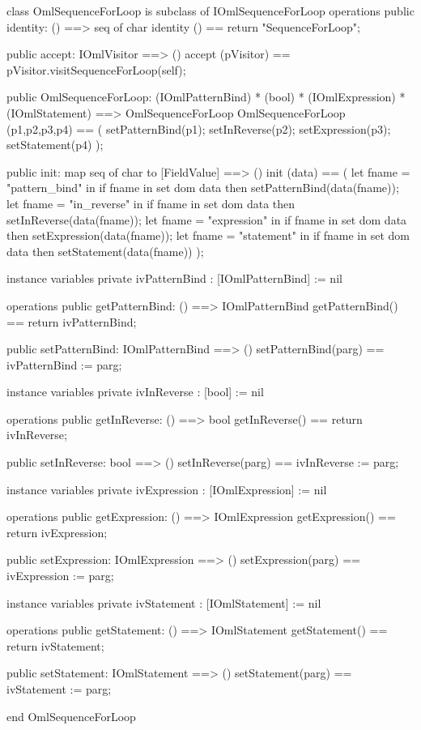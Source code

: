 \begin{vdm_al}
class OmlSequenceForLoop is subclass of IOmlSequenceForLoop
operations
  public identity: () ==> seq of char
  identity () == return "SequenceForLoop";

  public accept: IOmlVisitor ==> ()
  accept (pVisitor) == pVisitor.visitSequenceForLoop(self);

  public OmlSequenceForLoop:
      (IOmlPatternBind) *
      (bool) *
      (IOmlExpression) *
      (IOmlStatement) ==> OmlSequenceForLoop
  OmlSequenceForLoop (p1,p2,p3,p4) == 
   ( setPatternBind(p1);
     setInReverse(p2);
     setExpression(p3);
     setStatement(p4) );

  public init: map seq of char to [FieldValue] ==> ()
  init (data) ==
    ( let fname = "pattern_bind" in
        if fname in set dom data
        then setPatternBind(data(fname));
      let fname = "in_reverse" in
        if fname in set dom data
        then setInReverse(data(fname));
      let fname = "expression" in
        if fname in set dom data
        then setExpression(data(fname));
      let fname = "statement" in
        if fname in set dom data
        then setStatement(data(fname)) );

instance variables
  private ivPatternBind : [IOmlPatternBind] := nil

operations
  public getPatternBind: () ==> IOmlPatternBind
  getPatternBind() == return ivPatternBind;

  public setPatternBind: IOmlPatternBind ==> ()
  setPatternBind(parg) == ivPatternBind := parg;

instance variables
  private ivInReverse : [bool] := nil

operations
  public getInReverse: () ==> bool
  getInReverse() == return ivInReverse;

  public setInReverse: bool ==> ()
  setInReverse(parg) == ivInReverse := parg;

instance variables
  private ivExpression : [IOmlExpression] := nil

operations
  public getExpression: () ==> IOmlExpression
  getExpression() == return ivExpression;

  public setExpression: IOmlExpression ==> ()
  setExpression(parg) == ivExpression := parg;

instance variables
  private ivStatement : [IOmlStatement] := nil

operations
  public getStatement: () ==> IOmlStatement
  getStatement() == return ivStatement;

  public setStatement: IOmlStatement ==> ()
  setStatement(parg) == ivStatement := parg;

end OmlSequenceForLoop
\end{vdm_al}

